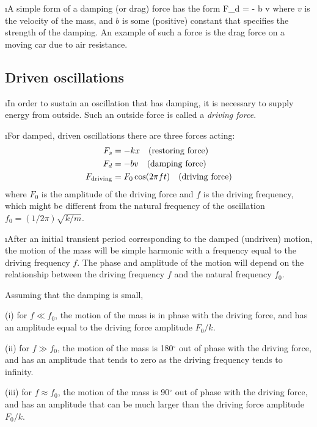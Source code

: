 \i A simple form of a damping (or drag) force has the form
%
\be
F_d = - b v
\ee
%
where $v$ is the velocity of the mass, and $b$ is some (positive) 
constant that specifies the strength of the damping.
An example of such a force is the drag force on a moving car 
due to air resistance.

\ei

\subsection{Driven oscillations}

\bi

\i In order to sustain an oscillation that has damping, it 
is necessary to supply energy from outside.
Such an outside force is called a {\em driving force}.

\i For damped, driven oscillations there are three 
forces acting:
%
\begin{align}
F_s&=-kx
\quad
({\rm restoring\ force})\\
F_d&=-bv
\quad
({\rm damping\ force})\\
F_{\rm driving}&=F_0\cos(2\pi f t)
\quad
({\rm driving\ force})
\end{align}
%
where $F_0$ is the amplitude of the driving force and 
$f$ is the driving frequency, which might be different 
from the natural frequency of the oscillation 
$f_0= (1/2\pi)\sqrt{k/m}$.

\i After an initial transient period corresponding to
the damped (undriven) motion, the motion of the
mass will be simple harmonic with a frequency equal to the driving 
frequency $f$.
The phase and amplitude of the motion will depend on the
relationship between the driving
frequency $f$ and the natural frequency $f_0$.

Assuming that the damping is small, 

(i) for $f\ll f_0$, the motion of the mass is 
in phase with the driving force, and has an amplitude equal 
to the driving force amplitude $F_0/k$.

(ii) for $f\gg f_0$, the motion of the mass is 
180$^\circ$ out of phase with the driving force, and
has an amplitude that tends to zero as the driving frequency
tends to infinity.

(iii) for $f\approx f_0$, the motion of the mass is
90$^\circ$ out of phase with the driving force,
and has an amplitude that can be much larger than the
driving force amplitude $F_0/k$. 

